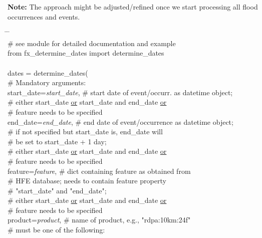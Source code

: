 \documentclass[10pt,a4paper,titlepage,parskip]{scrartcl}
\newenvironment{ttfont}{\fontfamily{\ttdefault}\selectfont}{\par}
\newcommand{\GRAU}[1]{\textcolor{ufzgray2}{#1}}
\begin{document}
\textbf{Note:} The approach might be adjusted/refined once we start processing all flood occurrences and events.

\begin{framed}
	\vspace*{-1.2cm}
	\begin{ttfont}
		\begin{tabbing}
			\hspace{1.0cm} \= \hspace{4.7cm} \= \kill \\[4pt]
			\GRAU{\# see module for detailed documentation and example}\\
			from fx\_determine\_dates import determine\_dates\\
			\\
			dates = determine\_dates(\\
			\> \GRAU{\# Mandatory arguments:}\\
			\> start\_date=\textit{start\_date}, \> \GRAU{\# start date of event/occurr. as datetime object;}\\
			\> \> \GRAU{\# either start\_date \underline{or} start\_date and end\_date \underline{or}}\\
			\> \> \GRAU{\# feature needs to be specified}\\
			\> end\_date=\textit{end\_date}, \> \GRAU{\# end date of event/occurrence as datetime object;}\\
			\> \> \GRAU{\# if not specified but start\_date is, end\_date will}\\
			\> \> \GRAU{\# be set to start\_date + 1 day;}\\
			\> \> \GRAU{\# either start\_date \underline{or} start\_date and end\_date \underline{or}}\\
			\> \> \GRAU{\# feature needs to be specified}\\
			\> feature=\textit{feature}, \> \GRAU{\# dict containing feature as obtained from}\\
			\> \> \GRAU{\# HFE database; needs to contain feature property }\\
			\> \> \GRAU{\# "start\_date" and "end\_date";}\\
			\> \> \GRAU{\# either start\_date \underline{or} start\_date and end\_date \underline{or}}\\
			\> \> \GRAU{\# feature needs to be specified}\\
			\> product=\textit{product}, \> \GRAU{\# name of product, e.g., "rdpa:10km:24f"}\\
			\> \> \GRAU{\# must be one of the following: }\\

\end{tabbing}
\end{ttfont}
\end{framed}
\end{document}
